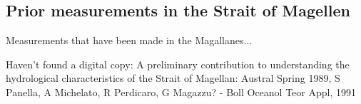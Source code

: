 \documentclass[11pt, oneside]{article}   	%
\begin{document}
\subsection*{Prior measurements in the Strait of Magellen}
Measurements that have been made in the Magallanes... \citep{antezana99}

Haven't found a digital copy: A preliminary contribution to understanding the hydrological characteristics of the Strait of Magellan: Austral Spring 1989, S Panella, A Michelato, R Perdicaro, G Magazzu? - Boll Oceanol Teor Appl, 1991

{}

\end{document}
